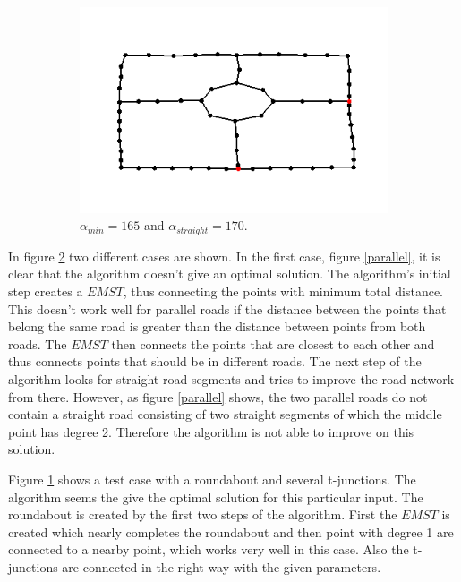 \documentclass[11pt]{article}
\begin{document}
\begin{figure}[h]
\begin{subfigure}{0.4\linewidth}
  \includegraphics[width=\linewidth]{roundabout167_170}
  \caption{$\alpha_{min}=165$ and $\alpha_{straight}=170$.}
  \label{roundabout}
  \end{subfigure}
  \caption{}
  \label{testcases}
\end{figure}

In figure \ref{testcases} two different cases are shown. In the first case, figure \ref{parallel}, it is clear that the algorithm doesn't give an optimal solution. The algorithm's initial step creates a $EMST$, thus connecting the points with minimum total distance. This doesn't work well for parallel roads if the distance between the points that belong the same road is greater than the distance between points from both roads. The $EMST$ then connects the points that are closest to each other and thus connects points that should be in different roads. The next step of the algorithm looks for straight road segments and tries to improve the road network from there. However, as figure \ref{parallel} shows, the two parallel roads do not contain a straight road consisting of two straight segments of which the middle point has degree 2. Therefore the algorithm is not able to improve on this solution.

Figure \ref{roundabout} shows a test case with a roundabout and several t-junctions. The algorithm seems the give the optimal solution for this particular input. The roundabout is created by the first two steps of the algorithm. First the $EMST$ is created which nearly completes the roundabout and then point with degree 1 are connected to a nearby point, which works very well in this case. Also the t-junctions are connected in the right way with the given parameters.
\end{document}
